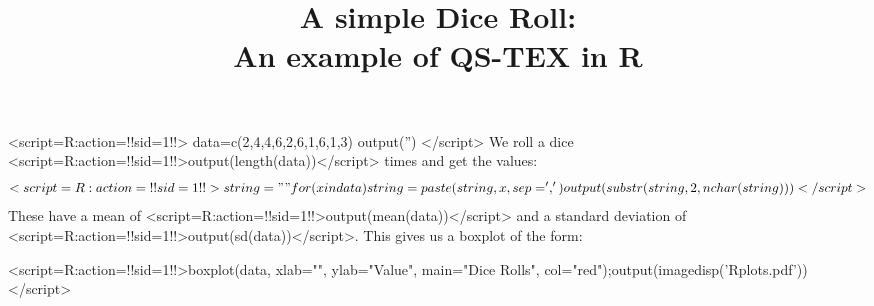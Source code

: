 \documentclass[a4paper,12pt]{article}
\title{A simple Dice Roll:\\An example of QS-TEX in R}
\begin{document}
\maketitle
<script=R:action={!!sid=1!!}>
data=c(2,4,4,6,2,6,1,6,1,3)
output('')
</script>
We roll a dice <script=R:action={!!sid=1!!}>output(length(data))</script> times and get the values:
\[<script=R:action={!!sid=1!!}>
string=""
for(x in data){string=paste(string,x,sep=',')}
output(substr(string,2,nchar(string)))
</script>\]
These have a mean of <script=R:action={!!sid=1!!}>output(mean(data))</script> and a standard deviation of <script=R:action={!!sid=1!!}>output(sd(data))</script>. This gives us a boxplot of the form:
\begin{center}
<script=R:action={!!sid=1!!}>boxplot(data, xlab="", ylab="Value", main="Dice Rolls", col="red");output(imagedisp('Rplots.pdf'))</script> \end{center}
\end{document}
